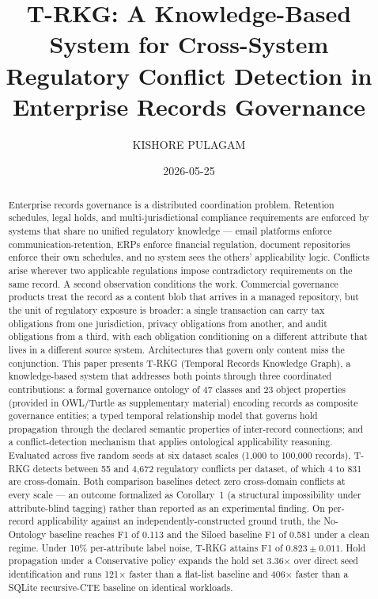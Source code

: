 \documentclass{ieeeaccess}
\title{T-RKG: A Knowledge-Based System for Cross-System Regulatory Conflict Detection in Enterprise Records Governance}
\author{\uppercase{Kishore Pulagam}\authorrefmark{1}\orcid{0009-0006-7929-8699}}
\date{2026-05-25}
\begin{document}
\maketitle

\begin{abstract}
Enterprise records governance is a distributed coordination problem. Retention schedules, legal holds, and multi-jurisdictional compliance requirements are enforced by systems that share no unified regulatory knowledge --- email platforms enforce communication-retention, ERPs enforce financial regulation, document repositories enforce their own schedules, and no system sees the others' applicability logic. Conflicts arise wherever two applicable regulations impose contradictory requirements on the same record. A second observation conditions the work. Commercial governance products treat the record as a content blob that arrives in a managed repository, but the unit of regulatory exposure is broader: a single transaction can carry tax obligations from one jurisdiction, privacy obligations from another, and audit obligations from a third, with each obligation conditioning on a different attribute that lives in a different source system. Architectures that govern only content miss the conjunction. This paper presents T-RKG (Temporal Records Knowledge Graph), a knowledge-based system that addresses both points through three coordinated contributions: a formal governance ontology of 47 classes and 23 object properties (provided in OWL/Turtle as supplementary material) encoding records as composite governance entities; a typed temporal relationship model that governs hold propagation through the declared semantic properties of inter-record connections; and a conflict-detection mechanism that applies ontological applicability reasoning. Evaluated across five random seeds at six dataset scales (1{,}000 to 100{,}000 records), T-RKG detects between 55 and 4{,}672 regulatory conflicts per dataset, of which 4 to 831 are cross-domain. Both comparison baselines detect zero cross-domain conflicts at every scale --- an outcome formalized as Corollary~1 (a structural impossibility under attribute-blind tagging) rather than reported as an experimental finding. On per-record applicability against an independently-constructed ground truth, the No-Ontology baseline reaches F1 of 0.113 and the Siloed baseline F1 of 0.581 under a clean regime. Under 10\% per-attribute label noise, T-RKG attains F1 of $0.823 \pm 0.011$. Hold propagation under a Conservative policy expands the hold set 3.36$\times$ over direct seed identification and runs 121$\times$ faster than a flat-list baseline and 406$\times$ faster than a SQLite recursive-CTE baseline on identical workloads.
\end{abstract}
\end{document}
